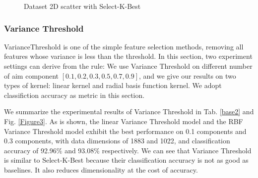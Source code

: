 \documentclass{article}
\begin{document}
\begin{figure}[htbp]
	\centering
	\quad
	\caption{Dataset 2D scatter with Select-K-Best}
	\label{Figure2}
\end{figure}
\subsubsection{Variance Threshold}
VarianceThreshold is one of the simple feature selection methods, removing all features whose variance is less than the threshold. In this section, two experiment settings can derive from the rule: We use Variance Threshold on different number of aim component $[0.1, 0.2, 0.3, 0.5, 0.7, 0.9]$, and we give our results on two types of kernel: linear kernel and radial basis function kernel. We adopt classifiction accuracy as metric in this section.

We summarize the experimental results of Variance Threshold in Tab. \ref{base2} and Fig. \ref{Figure3}. As is shown, the linear Variance Threshold model and the RBF Variance Threshold model exhibit the best performance on 0.1 components and 0.3 components, with data dimensions of 1883 and 1022, and classification accuracy of 92.96\% and 93.08\% respectively. We can see that Variance Threshold is similar to Select-K-Best because their classification accuracy is not as good as baselines. It also reduces dimensionality at the cost of accuracy.
\end{document}
